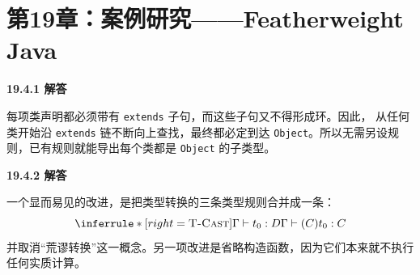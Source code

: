 \newpage
\section{第19章：案例研究——Featherweight Java}

\begin{taplauthorsolutionentrybox}
\label{sol:author:19.4.1}
\textbf{19.4.1 解答}

每项类声明都必须带有 \texttt{extends} 子句，而这些子句又不得形成环。因此，
从任何类开始沿 \texttt{extends} 链不断向上查找，最终都必定到达
\texttt{Object}。所以无需另设规则，已有规则就能导出每个类都是
\texttt{Object} 的子类型。

\end{taplauthorsolutionentrybox}

\begin{taplauthorsolutionentrybox}
\label{sol:author:19.4.2}
\textbf{19.4.2 解答}

一个显而易见的改进，是把类型转换的三条类型规则合并成一条：
\[
\inferrule*[right=\textsc{T-Cast}]
 {\Gamma\vdash t_0:D}
 {\Gamma\vdash(C)t_0:C}
\]
并取消“荒谬转换”这一概念。另一项改进是省略构造函数，因为它们本来就不执行
任何实质计算。

\end{taplauthorsolutionentrybox}


